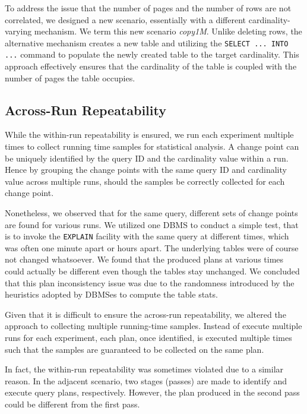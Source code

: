 To address the issue that the number of pages and the number of rows are not
correlated, we designed a new scenario, essentially with a different
cardinality-varying mechanism. We term this new scenario {\em copy1M}.
Unlike deleting rows, the alternative mechanism creates a new table and
utilizing the {\tt SELECT ... INTO ...} command to populate the newly created
table to the target cardinality. This approach effectively ensures that
the cardinality of the table is coupled with the number of pages the table
occupies.

\subsection{Across-Run Repeatability}
While the within-run repeatability is ensured, we run each experiment multiple
times to collect running time samples for statistical analysis. A change point
can be uniquely identified by the query ID and the cardinality value within
a run. Hence by grouping the change points with the same query ID and
cardinality value across multiple runs, should the samples be correctly
collected for each change point.

Nonetheless, we observed that for the same query, different sets of change
points are found for various runs. We utilized one DBMS to conduct a simple
test, that is to invoke the {\tt EXPLAIN} facility with the same query
at different times, which was often one minute apart or hours apart. The
underlying tables were of course not changed whatsoever. We found that
the produced plans at various times could actually be different even though
the tables stay unchanged. We concluded that this plan inconsistency issue
was due to the randomness introduced by the heuristics adopted by
DBMSes to compute the table stats.

Given that it is difficult to ensure the across-run repeatability,
we altered the approach to collecting multiple running-time samples.
Instead of execute multiple runs for each experiment, each plan, once
identified, is executed multiple times such that the samples are guaranteed
to be collected on the same plan.

In fact, the
within-run repeatability was sometimes violated due to a similar
reason. In the adjacent scenario, two stages (passes) are made to identify
and execute query plans, respectively. However, the plan produced in the
second pass could be different from the first pass.

